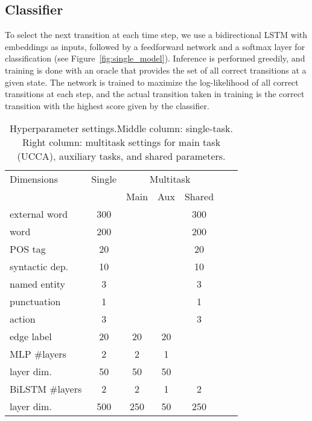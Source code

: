 \documentclass[11pt,a4paper]{article}
\begin{document}
\subsection{Classifier}\label{sec:classifier}
To select the next transition at each time step,
we use a bidirectional LSTM with embeddings as inputs,
followed by a feedforward network and a softmax layer for classification (see
Figure~\ref{fig:single_model}).
Inference is performed greedily,
and training is done with an oracle that provides the set of all correct transitions at a given state.
The network is trained to maximize the log-likelihood of all correct transitions at
each step, and the actual transition taken in training is the correct transition
with the highest score given by the classifier.

\begin{table}
\centering
\begin{tabular}{l|c|ccccc}
\footnotesize Dimensions &  \footnotesize Single & \multicolumn{3}{c}{\footnotesize Multitask} \\
&& \footnotesize Main & \footnotesize Aux & \footnotesize Shared \\
\hline
external word & 300 &&& 300 \\
word & 200 &&& 200 \\
POS tag & 20 &&& 20 \\
syntactic dep. & 10 &&& 10 \\
named entity & 3 &&& 3 \\
punctuation & 1 &&& 1 \\
action & 3 &&& 3 \\
edge label & 20 & 20 & 20 \\
MLP \#layers & 2 & 2 & 1 \\
\quad layer dim. & 50 & 50 & 50 \\
BiLSTM \#layers & 2 & 2 & 1 & 2 \\
\quad layer dim. & 500 & 250 & 50 & 250
\end{tabular}
\caption{Hyperparameter settings.\label{tab:hyperparams}
Middle column: single-task.
Right column: multitask settings for main task (UCCA), auxiliary tasks, and shared parameters.}
\end{table}
\end{document}
